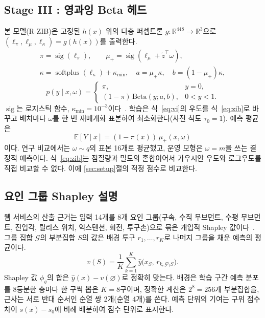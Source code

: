 \documentclass[journal,a4paper,10pt]{IEEEtran}
\newcommand{\sig}{\operatorname{sig}}
\newcommand{\softplus}{\operatorname{softplus}}
\newcommand{\E}{\mathbb{E}}
\begin{document}
\subsection{Stage III : 영과잉 Beta 헤드}
본 모델(R-ZIB)은 고정된 $h(x)$ 위의 다층 퍼셉트론 $g:\mathbb{R}^{448}\to\mathbb{R}^3$으로 $(\ell_\pi,\ell_\mu,\ell_\kappa)=g(h(x))$를 출력한다.
\begin{equation}
\begin{gathered}
\pi=\sig(\ell_\pi),\qquad \mu_+=\sig(\ell_\mu+\tilde z^\top\omega),\\
\kappa=\softplus(\ell_\kappa)+\kappa_{\min},\quad a=\mu_+\kappa,\quad b=(1-\mu_+)\kappa,
\end{gathered}
\label{eq:zibparam}
\end{equation}
\begin{equation}
p(y\mid x,\omega)=\begin{cases}\pi, & y=0,\\ (1-\pi)\,\mathrm{Beta}(y;a,b), & 0<y<1.\end{cases}
\label{eq:zib}
\end{equation}
$\sig$는 로지스틱 함수, $\kappa_{\min}=10^{-3}$이다~\cite{ferrari2004beta,ospina2012general}. 학습은 식~\eqref{eq:vi}의 우도를 식~\eqref{eq:zib}로 바꾸고 배치마다 $\omega$를 한 번 재매개화 표본하여 최소화한다(사전 척도 $\tau_0=1$). 예측 평균은
\begin{equation}
\E[Y\mid x]=(1-\pi(x))\,\mu_+(x,\omega)
\label{eq:pred}
\end{equation}
이다. 연구 비교에서는 $\omega\sim q$의 표본 16개로 평균했고, 운영 모형은 $\omega=m$을 쓰는 결정적 예측이다. 식~\eqref{eq:zib}는 점질량과 밀도의 혼합이어서 가우시안 우도와 로그우도를 직접 비교할 수 없다. 이에 \ref{sec:setup}절의 적정 점수로 비교한다.

\subsection{요인 그룹 Shapley 설명}
웹 서비스의 산출 근거는 입력 14개를 8개 요인 그룹(구속, 수직 무브먼트, 수평 무브먼트, 진입각, 릴리스 위치, 익스텐션, 회전, 투구손)으로 묶은 개입적 Shapley 값이다~\cite{shapley1953value,janzing2020feature}. 그룹 집합 $\mathcal{G}$의 부분집합 $S$의 값은 배경 투구 $r_1,\dots,r_K$로 나머지 그룹을 채운 예측의 평균이다.
\begin{equation}
v(S)=\frac1K\sum_{k=1}^{K}\hat y\big(x_S,\,r_{k,\mathcal{G}\setminus S}\big).
\label{eq:coalition}
\end{equation}
Shapley 값 $\phi_g$의 합은 $\hat y(x)-v(\varnothing)$로 정확히 맞는다. 배경은 학습 구간 예측 분포를 8등분한 층마다 한 구씩 뽑은 $K=8$구이며, 정확한 계산은 $2^8=256$개 부분집합을, 근사는 서로 반대 순서인 순열 쌍 2개(순열 4개)를 쓴다. 예측 단위의 기여는 구위 점수 차이 $s(x)-s_0$에 비례 배분하여 점수 단위로 표시한다.
\end{document}
